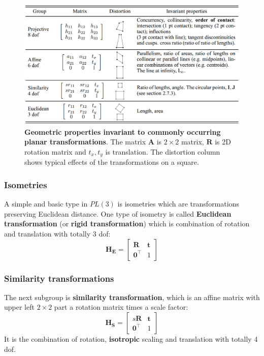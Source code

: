 \documentclass[12pt]{article}
\numberwithin{equation}{section}
\begin{document}
\begin{figure}[h]
\begin{center}
\includegraphics[width=1.0\textwidth]{proj_trans_types.png}
\end{center}
\caption{\textbf{Geometric properties invariant to commonly occurring planar transformations}. The matrix $\mathbf{A}$ is $2\times 2$ matrix, $\mathbf{R}$ is 2D rotation matrix and $t_x, t_y$ is translation. The distortion column shows typical effects of the transformations on a square. }
\label{fig:proj_type}
\end{figure}

\subsubsection{Isometries}

A simple and basic type in $PL(3)$ is isometries which are transformations preserving Euclidean distance. One type of isometry is called \textbf{Euclidean transformation} (or \textbf{rigid transformation}) which is combination of rotation and translation with totally 3 dof:
\begin{equation*}
\mathbf{H_E} = 
\begin{bmatrix}
\mathbf{R} & \mathbf{t} \\
\mathbf{0}^\top & 1
\end{bmatrix}
\end{equation*}

\subsubsection{Similarity transformations}
The next subgroup is \textbf{similarity transformation}, which is an affine matrix with upper left $2\times 2$ part a rotation matrix times a scale factor:
\begin{equation*}
\mathbf{H_S} = 
\begin{bmatrix}
s\mathbf{R} & \mathbf{t} \\
\mathbf{0}^\top & 1
\end{bmatrix}
\end{equation*}
It is the combination of rotation, \textbf{isotropic} scaling and translation with totally 4 dof.
\end{document}
